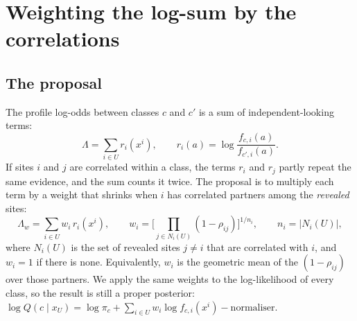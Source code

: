 \documentclass[11pt,a4paper]{article}
\begin{document}
\section{Weighting the log-sum by the correlations}
\subsection{The proposal}
The profile log-odds between classes $c$ and $c'$ is a sum of independent-looking terms:
\[
\Lambda=\sum_{i\in U}r_i(x^i),\qquad r_i(a)=\log\frac{f_{c,i}(a)}{f_{c',i}(a)} .
\]
If sites $i$ and $j$ are correlated within a class, the terms $r_i$ and $r_j$ partly repeat the same evidence, and the
sum counts it twice. The proposal is to multiply each term by a weight that shrinks when $i$ has correlated partners
among the \emph{revealed} sites:
\begin{equation}\label{eq:geo}
\Lambda_w=\sum_{i\in U}w_i\,r_i(x^i),\qquad
w_i=\Big[\prod_{j\in N_i(U)}(1-\rho_{ij})\Big]^{1/n_i},\qquad n_i=|N_i(U)| ,
\end{equation}
where $N_i(U)$ is the set of revealed sites $j\neq i$ that are correlated with $i$, and $w_i=1$ if there is none.
Equivalently, $w_i$ is the geometric mean of the $(1-\rho_{ij})$ over those partners. We apply the same weights to the
log-likelihood of every class, so the result is still a proper posterior:
$\log Q(c\mid x_U)=\log\pi_c+\sum_{i\in U}w_i\log f_{c,i}(x^i)-\text{normaliser}$.
\end{document}

